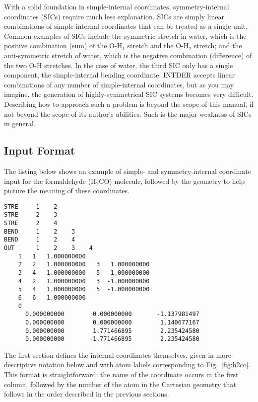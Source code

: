 \documentclass{article}
\begin{document}
With a solid foundation in simple-internal coordinates, symmetry-internal
coordinates (SICs) require much less explanation. SICs are simply linear
combinations of simple-internal coordinates that can be treated as a single
unit. Common examples of SICs include the symmetric stretch in water, which is
the positive combination (sum) of the O-H$_1$ stretch and the O-H$_2$ stretch;
and the anti-symmetric stretch of water, which is the negative combination
(difference) of the two O-H stretches. In the case of water, the third SIC only
has a single component, the simple-internal bending coordinate. INTDER accepts
linear combinations of any number of simple-internal coordinates, but as you may
imagine, the generation of highly-symmetrical SIC systems becomes very
difficult. Describing how to approach such a problem is beyond the scope of this
manual, if not beyond the scope of its author's abilities. Such is the major
weakness of SICs in general.

\subsection{Input Format}
\label{sec:coord-inp}

The listing below shows an example of simple- and symmetry-internal coordinate
input for the formaldehyde (H$_2$CO) molecule, followed by the geometry to help
picture the meaning of these coordinates.

\begin{lstlisting}
STRE     1    2
STRE     2    3
STRE     2    4
BEND     1    2    3
BEND     1    2    4
OUT      1    2    3    4
    1   1   1.000000000
    2   2   1.000000000   3   1.000000000
    3   4   1.000000000   5   1.000000000
    4   2   1.000000000   3  -1.000000000
    5   4   1.000000000   5  -1.000000000
    6   6   1.000000000
    0
      0.000000000        0.000000000       -1.137981497
      0.000000000        0.000000000        1.140677167
      0.000000000        1.771466895        2.235424580
      0.000000000       -1.771466895        2.235424580
\end{lstlisting}

The first section defines the internal coordinates themselves, given in more
descriptive notation below and with atom labels corresponding to
Fig.~\ref{fig:h2co}. This format is straightforward: the name of the coordinate
occurs in the first column, followed by the number of the atom in the Cartesian
geometry that follows in the order described in the previous sections.
\end{document}

